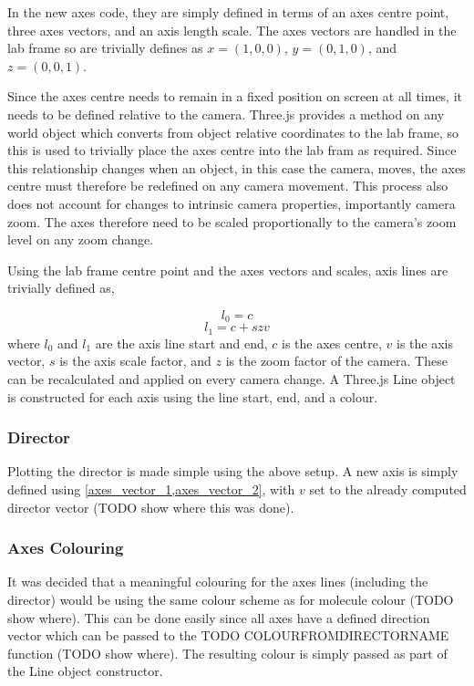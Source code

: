 In the new axes code, they are simply defined in terms of an axes centre point, three axes vectors, and an axis length scale. The axes vectors are handled in the lab frame so are trivially defines as $x=(1,0,0)$, $y=(0,1,0)$, and $z=(0,0,1)$.

Since the axes centre needs to remain in a fixed position on screen at all times, it needs to be defined relative to the camera. Three.js provides a method on any world object which converts from object relative coordinates to the lab frame, so this is used to trivially place the axes centre into the lab fram as required. Since this relationship changes when an object, in this case the camera, moves, the axes centre must therefore be redefined on any camera movement. This process also does not account for changes to intrinsic camera properties, importantly camera zoom. The axes therefore need to be scaled proportionally to the camera's zoom level on any zoom change.

Using the lab frame centre point and the axes vectors and scales, axis lines are trivially defined as,

\begin{equation}
  l_0=c\label{axes_vector_1}
\end{equation}
\begin{equation}
  l_1=c+szv\label{axes_vector_2}
\end{equation}
where $l_0$ and $l_1$ are the axis line start and end, $c$ is the axes centre, $v$ is the axis vector, $s$ is the axis scale factor, and $z$ is the zoom factor of the camera. These can be recalculated and applied on every camera change. A Three.js Line object is constructed for each axis using the line start, end, and a colour.

\subsubsection{Director}
\label{director_axis_plot}
Plotting the director is made simple using the above setup. A new axis is simply defined using \cref{axes_vector_1,axes_vector_2}, with $v$ set to the already computed director vector (TODO show where this was done).

\subsubsection{Axes Colouring}
It was decided that a meaningful colouring for the axes lines (including the director) would be using the same colour scheme as for molecule colour (TODO show where). This can be done easily since all axes have a defined direction vector which can be passed to the TODO COLOURFROMDIRECTORNAME function (TODO show where). The resulting colour is simply passed as part of the Line object constructor.

